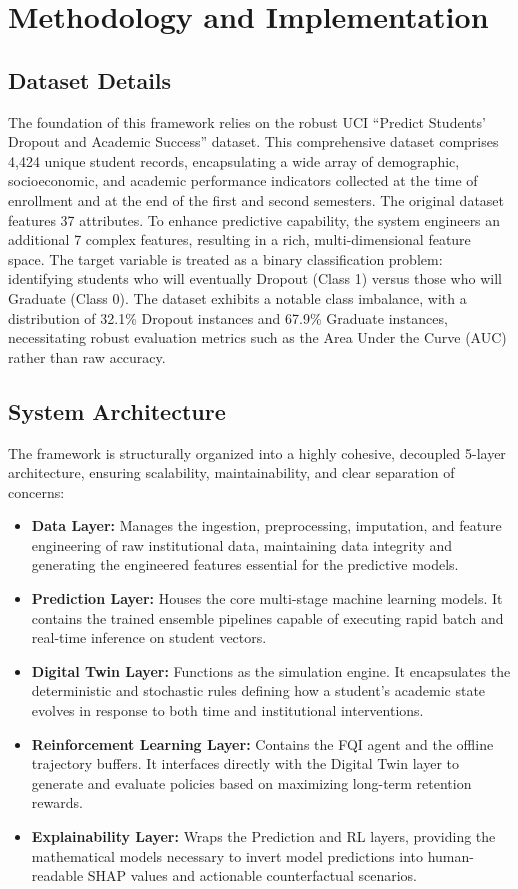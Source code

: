 \documentclass[12pt,a4paper]{report}
\begin{document}
\chapter{Methodology and Implementation}

\section{Dataset Details}
The foundation of this framework relies on the robust UCI ``Predict Students' Dropout and Academic Success'' dataset. This comprehensive dataset comprises 4,424 unique student records, encapsulating a wide array of demographic, socioeconomic, and academic performance indicators collected at the time of enrollment and at the end of the first and second semesters. The original dataset features 37 attributes. To enhance predictive capability, the system engineers an additional 7 complex features, resulting in a rich, multi-dimensional feature space. The target variable is treated as a binary classification problem: identifying students who will eventually Dropout (Class 1) versus those who will Graduate (Class 0). The dataset exhibits a notable class imbalance, with a distribution of 32.1\% Dropout instances and 67.9\% Graduate instances, necessitating robust evaluation metrics such as the Area Under the Curve (AUC) rather than raw accuracy.

\section{System Architecture}
The framework is structurally organized into a highly cohesive, decoupled 5-layer architecture, ensuring scalability, maintainability, and clear separation of concerns:
\begin{itemize}
    \item \textbf{Data Layer:} Manages the ingestion, preprocessing, imputation, and feature engineering of raw institutional data, maintaining data integrity and generating the engineered features essential for the predictive models.
    \item \textbf{Prediction Layer:} Houses the core multi-stage machine learning models. It contains the trained ensemble pipelines capable of executing rapid batch and real-time inference on student vectors.
    \item \textbf{Digital Twin Layer:} Functions as the simulation engine. It encapsulates the deterministic and stochastic rules defining how a student's academic state evolves in response to both time and institutional interventions.
    \item \textbf{Reinforcement Learning Layer:} Contains the FQI agent and the offline trajectory buffers. It interfaces directly with the Digital Twin layer to generate and evaluate policies based on maximizing long-term retention rewards.
    \item \textbf{Explainability Layer:} Wraps the Prediction and RL layers, providing the mathematical models necessary to invert model predictions into human-readable SHAP values and actionable counterfactual scenarios.
\end{itemize}
\end{document}
